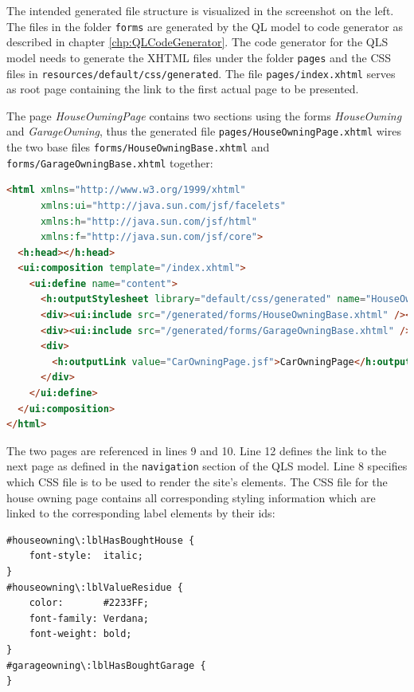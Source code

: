 The intended generated file structure is visualized in the screenshot on the
left. The files in the folder \texttt{forms} are generated by the QL model to
code generator as described in chapter \ref{chp:QLCodeGenerator}. The code
generator for the QLS model needs to generate the XHTML files under the folder
\texttt{pages} and the CSS files in \texttt{resources/default/css/generated}.
The file \texttt{pages/index.xhtml} serves as root page containing the link to
the first actual page to be presented.

The page \emph{HouseOwningPage} contains two sections using the forms \emph{HouseOwning} 
and \emph{GarageOwning}, thus the generated file
\texttt{pages/HouseOwningPage.xhtml} wires the two base files
\texttt{forms/HouseOwningBase.xhtml} and \texttt{forms/GarageOwningBase.xhtml}
together: \newline \newline

\begin{lstlisting}[language=HTML]
<html xmlns="http://www.w3.org/1999/xhtml"
      xmlns:ui="http://java.sun.com/jsf/facelets"
      xmlns:h="http://java.sun.com/jsf/html"
      xmlns:f="http://java.sun.com/jsf/core">
  <h:head></h:head>
  <ui:composition template="/index.xhtml">
    <ui:define name="content">
      <h:outputStylesheet library="default/css/generated" name="HouseOwningPage.css"  />
      <div><ui:include src="/generated/forms/HouseOwningBase.xhtml" /></div><p/>
      <div><ui:include src="/generated/forms/GarageOwningBase.xhtml" /></div>
  	  <div>
  	    <h:outputLink value="CarOwningPage.jsf">CarOwningPage</h:outputLink>
  	  </div>
    </ui:define>
  </ui:composition>
</html>
\end{lstlisting}

The two pages are referenced in lines 9 and 10. Line 12 defines the link to the
next page as defined in the \texttt{navigation} section of the QLS model. Line 8
specifies which CSS file is to be used to render the site's elements. The CSS
file for the house owning page contains all corresponding styling information 
which are linked to the corresponding label elements by their ids:

\begin{lstlisting}[language=HTML]
#houseowning\:lblHasBoughtHouse {
	font-style:  italic; 	
}
#houseowning\:lblValueResidue {
	color:       #2233FF; 
	font-family: Verdana; 	
	font-weight: bold; 		
}
#garageowning\:lblHasBoughtGarage {
}
\end{lstlisting}

